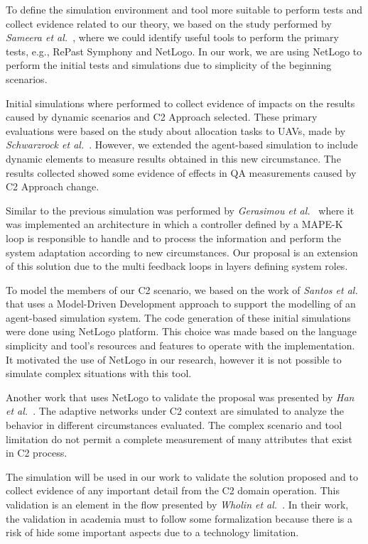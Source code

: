 To define the simulation environment and tool more suitable to perform tests and collect evidence related to our theory, we based on the study performed by \textit{Sameera et al.}~\cite{ABAR201713}, where we could identify useful tools to perform the primary tests, e.g., RePast Symphony and NetLogo. In our work, we are using NetLogo to perform the initial tests and simulations due to simplicity of the beginning scenarios.

Initial simulations where performed to collect evidence of impacts on the results caused by dynamic scenarios and C2 Approach selected. These primary evaluations were based on the study about allocation tasks to UAVs, made by \textit{Schwarzrock et al.}~\cite{Schwarzrock2017}. However, we extended the agent-based simulation to include dynamic elements to measure results obtained in this new circumstance. The results collected showed some evidence of effects in QA measurements caused by C2 Approach change.

Similar to the previous simulation was performed by \textit{Gerasimou et al.}~\cite{UUV} where it was implemented an architecture in which a controller defined by a MAPE-K loop is responsible to handle and to process the information and perform the system adaptation according to new circumstances. Our proposal is an extension of this solution due to the multi feedback loops in layers defining system roles.

To model the members of our C2 scenario, we based on the work of \textit{Santos et al.}~\cite{SANTOS2018162} that uses a Model-Driven Development approach to support the modelling of an agent-based simulation system. The code generation of these initial simulations were done using NetLogo platform. This choice was made based on the language simplicity and tool's resources and features to operate with the implementation. It motivated the use of NetLogo in our research, however it is not possible to simulate complex situations with this tool.

Another work that uses NetLogo to validate the proposal was presented by \textit{Han et al.}~\cite{c2-02}. The adaptive networks under C2 context are simulated to analyze the behavior in different circumstances evaluated. The complex scenario and tool limitation do not permit a complete measurement of many attributes that exist in C2 process.



The simulation will be used in our work to validate the solution proposed and to collect evidence of any important detail from the C2 domain operation. This validation is an element in the flow presented by \textit{Wholin et al.}~\cite{ClaesWohlinPerRuneson2012}. In their work, the validation in academia must to follow some formalization because there is a risk of hide some important aspects due to a technology limitation.

